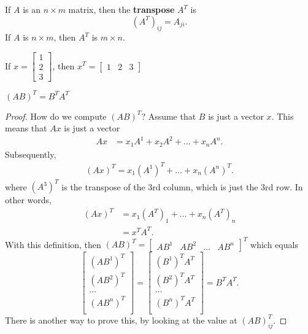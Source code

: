 
\begin{definition}
	If \( A \) is an \( n\times m \) matrix, then the \textbf{transpose} \( A^{T}  \) is \[
		(A^{T})_{ij} =  A_{ji}
	.\] 
	If \( A \) is \( n\times m \), then \( A^{T}  \) is \( m\times n \).
\end{definition}

\begin{eg}
	If \( x = \begin{bmatrix}
		1 \\ 2 \\ 3
	\end{bmatrix} \), then \( x^{T} = \begin{bmatrix}
	1 & 2 & 3
	\end{bmatrix}  \)
\end{eg}

\begin{prop}
	\( (AB)^{T}=B^{T}A^{T}    \)
\end{prop}
\begin{proof}
	How do we compute \( (AB)^{T}  \)? Assume that \( B \) is just a vector \( x \). This means that \( Ax \) is just a vector
	\begin{align*}
		Ax &= x_{1}A^{1}+x_{2}A^{2} + \ldots  + x_n A^{n}
	.\end{align*} Subsequently, 
	\begin{align*}
		(Ax)^{T} = x_{1}(A^{1} )^{T} + \ldots + x_{n}(A^{n} )^{T} 
	.\end{align*}
	where \( (A^{3} )^{T}  \) is the transpose of the 3rd column, which is just the 3rd row. In other words, 
	\begin{align*}
		(Ax)^{T} &= x_{1}(A^{T} )_{1} + \ldots + x_{n}(A^{T} )_{n}  \\
		&= x^{T}A^{T}
	.\end{align*}
	With this definition, then \( (AB)^{T} = \begin{bmatrix}
		AB^{1} & AB^{2} & \ldots  & AB^{n}   
	\end{bmatrix}^{T}  \) which equals \[
		\begin{bmatrix}
			(AB^{1} )^{T}  \\
			(AB^{2} )^{T}  \\
			\ldots  \\
			(AB^{n} )^{T}  \\
		\end{bmatrix} = \begin{bmatrix}
		(B^{1} )^{T}A^{T}   \\
		(B^{2} )^{T}A^{T}   \\
		\ldots \\
		(B^{n} )^{T}A^{T}   \\
		\end{bmatrix} = B^{T}A^{T}  
	.\] There is another way to prove this, by looking at the value at \( (AB)^{T}_{ij}  \).
\end{proof}

